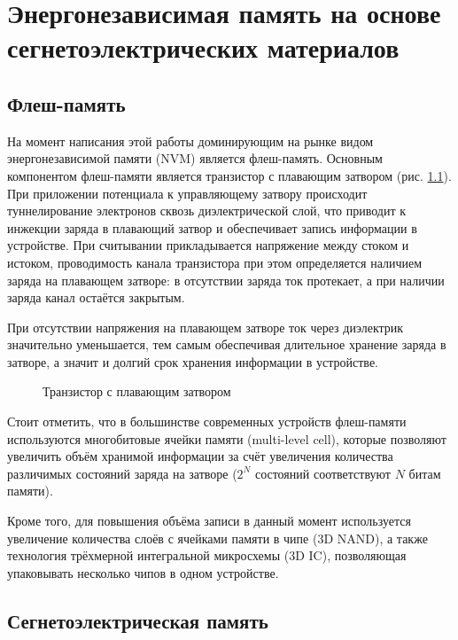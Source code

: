\chapter{Энергонезависимая память на основе сегнетоэлектрических материалов}\label{ch:ch1}
\section{Флеш-память}\label{sec:ch1/sec1}
На момент написания этой работы доминирующим на рынке видом энергонезависимой памяти (NVM) является флеш-память. Основным компонентом флеш-памяти является транзистор с плавающим затвором (рис. \cref{fig:floating_gate_transistor}). При приложении потенциала к управляющему затвору происходит туннелирование электронов сквозь диэлектрической слой, что приводит к инжекции заряда в плавающий затвор и обеспечивает запись информации в устройстве. При считывании прикладывается напряжение между стоком и истоком, проводимость канала транзистора при этом определяется наличием заряда на плавающем затворе: в отсутствии заряда ток протекает, а при наличии заряда канал остаётся закрытым.

При отсутствии напряжения на плавающем затворе ток через диэлектрик значительно уменьшается, тем самым обеспечивая длительное хранение заряда в затворе, а значит и долгий срок хранения информации в устройстве.

\begin{figure}[ht]
    \caption{Транзистор с плавающим затвором}\label{fig:floating_gate_transistor}
\end{figure}

Стоит отметить, что в большинстве современных устройств флеш-памяти используются многобитовые ячейки памяти (multi-level cell), которые позволяют увеличить объём хранимой информации за счёт увеличения количества различимых состояний заряда на затворе (\(2^N\) состояний соответствуют \(N\) битам памяти).

Кроме того, для повышения объёма записи в данный момент используется увеличение количества слоёв с ячейками памяти в чипе (3D NAND), а также технология трёхмерной интегральной микросхемы (3D IC), позволяющая упаковывать несколько чипов в одном устройстве.

\section{Сегнетоэлектрическая память}\label{sec:ch1/sec2}

